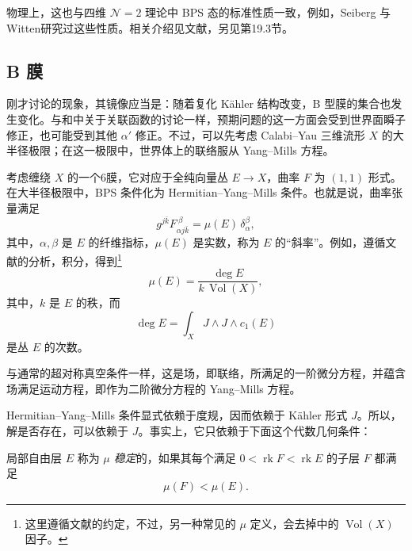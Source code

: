 物理上，这也与四维 $\mathcal{N}=2$ 理论中 BPS 态的标准性质一致，例如，Seiberg 与 Witten研究过这些性质。相关介绍见文献，另见第19.3节。

\subsection{B 膜}\label{sec:5.2.2}

刚才讨论的现象，其镜像应当是：随着复化 K\"ahler 结构改变，B 型膜的集合也发生变化。与和中关于关联函数的讨论一样，预期问题的这一方面会受到世界面瞬子修正，也可能受到其他 $\alpha'$ 修正。不过，可以先考虑 Calabi--Yau 三维流形 $X$ 的大半径极限；在这一极限中，世界体上的联络服从 Yang--Mills 方程。

考虑缠绕 $X$ 的一个6膜，它对应于全纯向量丛 $E\to X$，曲率 $F$ 为 $(1,1)$ 形式。在大半径极限中，BPS 条件化为 Hermitian--Yang--Mills 条件。也就是说，曲率张量满足
\begin{equation}\label{eq:5.32}
g^{j\bar k}F^{\ \beta}_{\alpha j\bar k}
=\mu(E)\,\delta_\alpha^\beta,
\end{equation}
其中，$\alpha,\beta$ 是 $E$ 的纤维指标，$\mu(E)$ 是实数，称为 $E$ 的“斜率”。例如，遵循文献的分析，积分，得到\footnote{这里遵循文献的约定，不过，另一种常见的 $\mu$ 定义，会去掉中的 $\operatorname{Vol}(X)$ 因子。}
\begin{equation}\label{eq:5.33}
\mu(E)=\frac{\deg E}{k\,\operatorname{Vol}(X)},
\end{equation}
其中，$k$ 是 $E$ 的秩，而
\begin{equation}\label{eq:5.34}
\deg E=\int_XJ\wedge J\wedge c_1(E)
\end{equation}
是丛 $E$ 的次数。

与通常的超对称真空条件一样，这是场，即联络，所满足的一阶微分方程，并蕴含场满足运动方程，即作为二阶微分方程的 Yang--Mills 方程。

Hermitian--Yang--Mills 条件显式依赖于度规，因而依赖于 K\"ahler 形式 $J$。所以，解是否存在，可以依赖于 $J$。事实上，它只依赖于下面这个代数几何条件：
\begin{definition}\label{def:5.7}
局部自由层 $E$ 称为 \emph{$\mu$ 稳定}的，如果其每个满足 $0<\operatorname{rk}F<\operatorname{rk}E$ 的子层 $F$ 都满足
\begin{equation}\label{eq:5.35}
\mu(F)<\mu(E).
\end{equation}
\end{definition}

